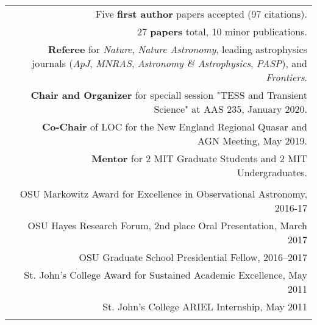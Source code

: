 \documentclass[letterpaper,12pt]{article}
\begin{document}
\begin{longtable}{LR}
\underline{} &
 Five \textbf{first author} papers accepted (97 citations). \\
 \underline{}
 & 27 \textbf{papers} total,  10 minor publications.\\
 & \textbf{Referee} for \textit{Nature}, \textit{Nature Astronomy}, leading astrophysics journals (\textit{ApJ}, \textit{MNRAS}, \textit{Astronomy \& Astrophysics}, \textit{PASP}), and
   \textit{Frontiers}.\\%
   &\textbf{Chair and Organizer} for speciall session "TESS and Transient Science" at  AAS 235, January 2020.\\
   &\textbf{Co-Chair} of LOC for the New England Regional Quasar and AGN Meeting, May 2019.\\
   & \textbf{Mentor} for 2 MIT Graduate Students and 2 MIT Undergraduates.\\
\\

\underline{} & OSU Markowitz Award for Excellence in Observational Astronomy, 2016-17\\
\underline{} & OSU Hayes Research Forum, 2nd place Oral Presentation, March 2017 \\
&OSU Graduate School Presidential Fellow, 2016--2017\\
&St. John's College Award for Sustained Academic Excellence, May 2011\\
&St. John's College ARIEL Internship, May 2011\\
\\


\end{longtable}
\end{document}
